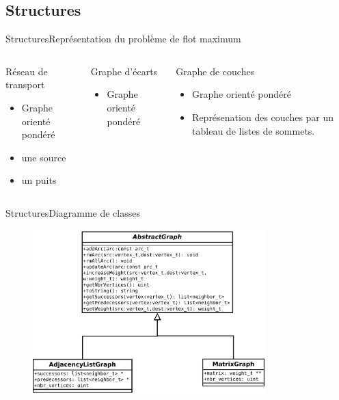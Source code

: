 \subsection{Structures}
\begin{frame}{Structures}{Représentation du problème de flot maximum}
\begin{columns}[t]
  \begin{column}[l]{0.3\textwidth}
	\begin{block}{Réseau de transport}
  	\begin{itemize}
    	\item Graphe orienté pondéré
    	\item une source
    	\item un puits
  	\end{itemize}
	\end{block}
	\end{column}
    \begin{column}[l]{0.3\textwidth}
	\begin{block}{Graphe d'écarts}
  	\begin{itemize}
    	\item Graphe orienté pondéré
  	\end{itemize}
	\end{block}
	\end{column}
    \begin{column}[l]{0.4\textwidth}
		\begin{block}{Graphe de couches}
  	\begin{itemize}
    	\item Graphe orienté pondéré
  	  \item Représenation des couches par un tableau de listes de sommets.
  	\end{itemize}
	\end{block}
	\end{column}
	\end{columns}
\end{frame}

\begin{frame}{Structures}{Diagramme de classes}
	\begin{figure}
	\includegraphics[width=0.8\textwidth]{img/diag_class.pdf}
	\end{figure}
\end{frame}

